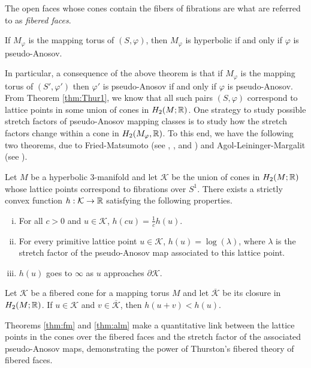 The open faces whose cones contain the fibers of fibrations are what are referred to as
\emph{fibered faces}.  %

\begin{thm}
    \label{thm:ThurHyp}
  If $M_\varphi$ is the mapping torus of $(S, \varphi)$, then $M_\varphi$ is hyperbolic if and only if $\varphi$ is pseudo-Anosov.
\end{thm}

In particular, a consequence of the above theorem is that if $M_\varphi$ is the mapping torus of $(S', \varphi')$ then $\varphi'$ is pseudo-Anosov if and only if $\varphi$ is pseudo-Anosov. From Theorem \ref{thm:Thur1}, we know that all such pairs $(S, \varphi)$ correspond to lattice points in some union of
cones in $H_2(M;\mathbb{R})$. One strategy to study possible stretch factors of pseudo-Anosov mapping classes is to study how the stretch factors change within a cone in $H_2(M_\varphi,\mathbb{R})$. To this end, we have the following two
theorems, due to Fried-Matsumoto (see \cite{fried1982flow}, \cite{fried1983transitive}, and
\cite{matsumoto1987topological}) and Agol-Leininger-Margalit (see \cite{agol6983pseudo}).

\begin{thm}
  \label{thm:fm}
  Let $M$ be a hyperbolic $3$-manifold and let $\mathcal{K}$ be the union of cones in
  $H_2(M; \mathbb{R})$ whose lattice points correspond to fibrations over $S^1$.  There exists a strictly
  convex function $h: \mathcal{K} \to \mathbb{R}$ satisfying the following properties.
  \begin{enumerate}[(i)]
  \item For all $c > 0$ and $u \in \mathcal{K}$, $h(cu) =  \frac{1}{c}h(u)$.
  \item For every primitive lattice point $u \in \mathcal{K}$, $h(u) = \log(\lambda)$, where $\lambda$ is the
    stretch factor of the pseudo-Anosov map associated to this lattice point.
  \item $h(u)$ goes to $\infty$ as $u$ approaches $\partial \mathcal{K}$.
  \end{enumerate}
\end{thm}

\begin{thm}
  \label{thm:alm}
  Let $\mathcal{K}$ be a fibered cone for a mapping torus $M$ and let $\overline{\mathcal{K}}$ be its closure
  in $H_2(M;\mathbb{R})$. If $u \in \mathcal{K}$ and $v \in \overline{\mathcal{K}}$, then $h(u+v) < h(u)$.
\end{thm}
Theorems \ref{thm:fm} and \ref{thm:alm} make a quantitative link between the lattice points in the cones over
the fibered faces and the stretch factor of the associated pseudo-Anosov maps, demonstrating the power of
Thurston's fibered theory of fibered faces.

